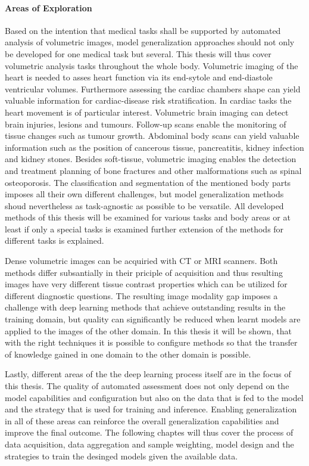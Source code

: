         \paragraph{Areas of Exploration}
            Based on the intention that medical tasks shall be supported by automated analysis of volumetric images, model generalization approaches should not only be developed for one medical task but several.
            This thesis will thus cover volumetric analysis tasks throughout the whole body.
            Volumetric imaging of the heart is needed to asses heart function via its end-sytole and end-diastole ventricular volumes. Furthermore assessing the cardiac chambers shape can yield valuable information for cardiac-disease risk stratification. In cardiac tasks the heart movement is of particular interest.
            Volumetric brain imaging can detect brain injuries, lesions and tumours. Follow-up scans enable the monitoring of tissue changes such as tumour growth.
            Abdominal body scans can yield valuable information such as the position of cancerous tissue, pancreatitis, kidney infection and kidney stones.
            Besides soft-tissue, volumetric imaging enables the detection and treatment planning of bone fractures and other malformations such as spinal osteoporosis.
            The classification and segmentation of the mentioned body parts imposes all their own different challenges, but model generalization methods shoud nevertheless as task-agnostic as possible to be versatile. All developed methods of this thesis will be examined for various tasks and body areas or at least if only a special tasks is examined further extension of the methods for different tasks is explained.

            Dense volumetric images can be acquiried with CT or MRI scanners. Both methods differ subsantially in their priciple of acquisition and thus resulting images have very different tissue contrast properties which can be utilized for different diagnostic questions.
            The resulting image modality gap imposes a challenge with deep learning methods that achieve outstanding results in the training domain, but quality can significantly be reduced when learnt models are applied to the images of the other domain.
            In this thesis it will be shown, that with the right techniques it is possible to configure methods so that the transfer of knowledge gained in one domain to the other domain is possible.

            Lastly, different areas of the the deep learning process itself are in the focus of this thesis.
            The quality of automated assessment does not only depend on the model capabilities and configuration but also on the data that is fed to the model and the strategy that is used for training and inference.
            Enabling generalization in all of these areas can reinforce the overall generalization capabilities and improve the final outcome. The following chaptes will thus cover the process of data acquisition, data aggregation and sample weighting, model design and the strategies to train the desinged models given the available data.

